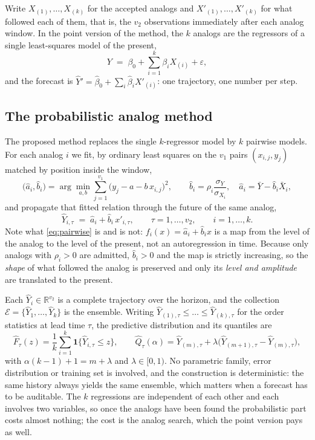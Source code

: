 \documentclass[12pt,a4paper]{article}
\begin{document}
Write $X_{(1)},\dots,X_{(k)}$ for the accepted analogs and
$X'_{(1)},\dots,X'_{(k)}$ for what followed each of them, that is, the $v_2$
observations immediately after each analog window. In the point version of the
method, the $k$ analogs are the regressors of a single least-squares model of
the present,
\begin{equation}
Y \;=\; \beta_0 + \sum_{i=1}^{k}\beta_i X_{(i)} + \varepsilon ,
\end{equation}
and the forecast is $\hat{Y}' = \hat\beta_0 + \sum_i \hat\beta_i X'_{(i)}$: one
trajectory, one number per step.

\subsection{The probabilistic analog method}
\label{sec:prob}

The proposed method replaces the single $k$-regressor model by $k$ pairwise
models. For each analog $i$ we fit, by ordinary least squares on the $v_1$
pairs $(x_{i,j},y_j)$ matched by position inside the window,
\begin{equation}
\bigl(\hat a_i,\hat b_i\bigr)=\arg\min_{a,b}
\sum_{j=1}^{v_1}\bigl(y_j-a-b\,x_{i,j}\bigr)^2 ,
\qquad
\hat b_i=\rho_i\frac{\sigma_Y}{\sigma_{X_i}},\quad
\hat a_i=\bar Y-\hat b_i\bar X_i ,
\label{eq:pairwise}
\end{equation}
and propagate that fitted relation through the future of the same analog,
\begin{equation}
\hat Y_{i,\tau} \;=\; \hat a_i + \hat b_i\, x'_{i,\tau} ,
\qquad \tau=1,\dots,v_2,\qquad i=1,\dots,k .
\label{eq:scenario}
\end{equation}
Note what \eqref{eq:pairwise} is and is not: $f_i(x)=\hat a_i+\hat b_i x$ is a
map from the level of the analog to the level of the present, not an
autoregression in time. Because only analogs with $\rho_i>0$ are admitted,
$\hat b_i>0$ and the map is strictly increasing, so the \emph{shape} of what
followed the analog is preserved and only its \emph{level and amplitude} are
translated to the present.

Each $\hat Y_i\in\mathbb{R}^{v_2}$ is a complete trajectory over the horizon,
and the collection $\mathcal{E}=\{\hat Y_1,\dots,\hat Y_k\}$ is the ensemble.
Writing $\hat Y_{(1),\tau}\le\dots\le\hat Y_{(k),\tau}$ for the order
statistics at lead time $\tau$, the predictive distribution and its quantiles
are
\begin{equation}
\hat F_\tau(z)=\frac{1}{k}\sum_{i=1}^{k}
\mathbf{1}\bigl\{\hat Y_{i,\tau}\le z\bigr\},
\qquad
\hat Q_\tau(\alpha)=\hat Y_{(m),\tau}+\lambda
\bigl(\hat Y_{(m+1),\tau}-\hat Y_{(m),\tau}\bigr),
\label{eq:quantile}
\end{equation}
with $\alpha(k-1)+1=m+\lambda$ and $\lambda\in[0,1)$. No parametric family,
error distribution or training set is involved, and the construction is
deterministic: the same history always yields the same ensemble, which matters
when a forecast has to be auditable. The $k$ regressions are independent of
each other and each involves two variables, so once the analogs have been
found the probabilistic part costs almost nothing; the cost is the analog
search, which the point version pays as well.
\end{document}
